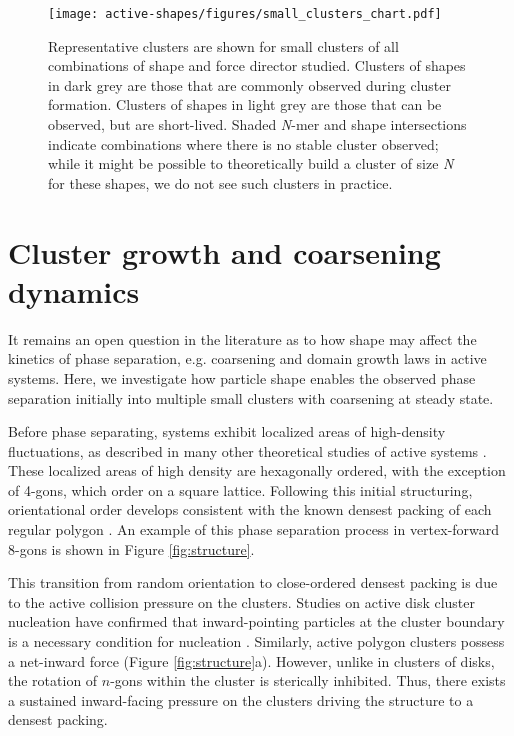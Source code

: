 \begin{figure}[t]
\begin{center}
\texttt{[image: active-shapes/figures/small\_clusters\_chart.pdf]}
\caption{
Representative clusters are shown for small clusters of all combinations of shape and force director studied.
Clusters of shapes in dark grey are those that are commonly observed during cluster formation.
Clusters of shapes in light grey are those that can be observed, but are short-lived.
Shaded \textit{N}-mer and shape intersections indicate combinations where there is no stable cluster observed; while it might be possible to theoretically build a cluster of size \textit{N} for these shapes, we do not see such clusters in practice.
}
\label{fig:SI_clusters}
\end{center}
\end{figure}

\section{Cluster growth and coarsening dynamics}

It remains an open question in the literature as to how shape may affect the kinetics of phase separation, e.g. coarsening and domain growth laws in active systems.
Here, we investigate how particle shape enables the observed phase separation initially into multiple small clusters with coarsening at steady state.

Before phase separating, systems exhibit localized areas of high-density fluctuations, as described in many other theoretical studies of active systems \cite{Cates_2013_EPL, Fily_2012_PRL}.
These localized areas of high density are hexagonally ordered, with the exception of 4-gons, which order on a square lattice.
Following this initial structuring, orientational order develops consistent with the known densest packing of each regular polygon \cite{Atkinson_2012_PRE}.
An example of this phase separation process in vertex-forward 8-gons is shown in Figure \ref{fig:structure}.

This transition from random orientation to close-ordered densest packing is due to the active collision pressure on the clusters.
Studies on active disk cluster nucleation have confirmed that inward-pointing particles at the cluster boundary is a necessary condition for nucleation \cite{Redner_2016_PRL,Richard_2016_SoftMatter}.
Similarly, active polygon clusters possess a net-inward force (Figure \ref{fig:structure}a).
However, unlike in clusters of disks, the rotation of $n$-gons within the cluster is sterically inhibited.
Thus, there exists a sustained inward-facing pressure on the clusters driving the structure to a densest packing.

